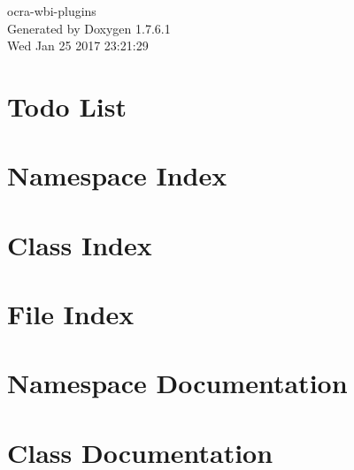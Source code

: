 \documentclass[a4paper]{book}
\begin{document}
\hypersetup{pageanchor=false,citecolor=blue}
\begin{titlepage}
\vspace*{7cm}
\begin{center}
{\Large ocra-\/wbi-\/plugins }\\
\vspace*{1cm}
{\large \-Generated by Doxygen 1.7.6.1}\\
\vspace*{0.5cm}
{\small Wed Jan 25 2017 23:21:29}\\
\end{center}
\end{titlepage}
\clearemptydoublepage
{}
\tableofcontents
\clearemptydoublepage
{}
\hypersetup{pageanchor=true,citecolor=blue}
\chapter{\-Todo \-List}
\label{todo}
\hypertarget{todo}{}

\chapter{\-Namespace \-Index}

\chapter{\-Class \-Index}

\chapter{\-File \-Index}

\chapter{\-Namespace \-Documentation}

\chapter{\-Class \-Documentation}























\end{document}

